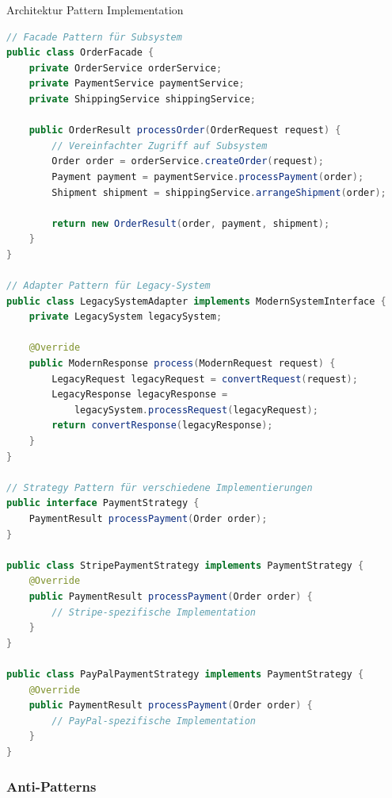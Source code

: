 \begin{example2}{Architektur Pattern Implementation}
\begin{lstlisting}[language=Java, style=basesmol]
// Facade Pattern für Subsystem
public class OrderFacade {
    private OrderService orderService;
    private PaymentService paymentService;
    private ShippingService shippingService;
    
    public OrderResult processOrder(OrderRequest request) {
        // Vereinfachter Zugriff auf Subsystem
        Order order = orderService.createOrder(request);
        Payment payment = paymentService.processPayment(order);
        Shipment shipment = shippingService.arrangeShipment(order);
        
        return new OrderResult(order, payment, shipment);
    }
}

// Adapter Pattern für Legacy-System
public class LegacySystemAdapter implements ModernSystemInterface {
    private LegacySystem legacySystem;
    
    @Override
    public ModernResponse process(ModernRequest request) {
        LegacyRequest legacyRequest = convertRequest(request);
        LegacyResponse legacyResponse = 
            legacySystem.processRequest(legacyRequest);
        return convertResponse(legacyResponse);
    }
}

// Strategy Pattern für verschiedene Implementierungen
public interface PaymentStrategy {
    PaymentResult processPayment(Order order);
}

public class StripePaymentStrategy implements PaymentStrategy {
    @Override
    public PaymentResult processPayment(Order order) {
        // Stripe-spezifische Implementation
    }
}

public class PayPalPaymentStrategy implements PaymentStrategy {
    @Override
    public PaymentResult processPayment(Order order) {
        // PayPal-spezifische Implementation
    }
}
\end{lstlisting}
\end{example2}

\subsubsection{Anti-Patterns}

